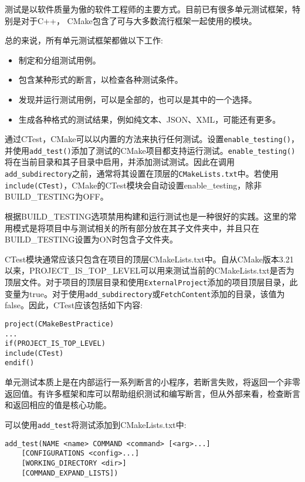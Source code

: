 测试是以软件质量为傲的软件工程师的主要方式。目前已有很多单元测试框架，特别是对于C++， CMake包含了可与大多数流行框架一起使用的模块。

总的来说，所有单元测试框架都做以下工作:

\begin{itemize}
\item 
制定和分组测试用例。

\item 
包含某种形式的断言，以检查各种测试条件。

\item 
发现并运行测试用例，可以是全部的，也可以是其中的一个选择。

\item 
生成各种格式的测试结果，例如纯文本、JSON、XML，可能还有更多。
\end{itemize}

通过CTest，CMake可以以内置的方法来执行任何测试。设置\texttt{enable\_testing()}，并使用\texttt{add\_test()}添加了测试的CMake项目都支持运行测试。\texttt{enable\_testing()}将在当前目录和其子目录中启用，并添加测试测试。因此在调用\texttt{add\_subdirectory}之前，通常将其设置在顶层的\texttt{CMakeLists.txt}中。若使用\texttt{include(CTest)}，CMake的CTest模块会自动设置enable\_testing，除非BUILD\_TESTING为OFF。

根据BUILD\_TESTING选项禁用构建和运行测试也是一种很好的实践。这里的常用模式是将项目中与测试相关的所有部分放在其子文件夹中，并且只在BUILD\_TESTING设置为ON时包含子文件夹。

CTest模块通常应该只包含在项目的顶层CMakeLists.txt中。自从CMake版本3.21以来，PROJECT\_IS\_TOP\_LEVEL可以用来测试当前的CMakeLists.txt是否为顶层文件。对于项目的顶层目录和使用\texttt{ExternalProject}添加的项目顶层目录，此变量为true。对于使用\texttt{add\_subdirectory}或\texttt{FetchContent}添加的目录，该值为false。因此，CTest应该包括如下内容:

\begin{lstlisting}[style=styleCMake]
project(CMakeBestPractice)
...
if(PROJECT_IS_TOP_LEVEL)
include(CTest)
endif()
\end{lstlisting}

单元测试本质上是在内部运行一系列断言的小程序，若断言失败，将返回一个非零返回值。有许多框架和库可以帮助组织测试和编写断言，但从外部来看，检查断言和返回相应的值是核心功能。

可以使用\texttt{add\_test}将测试添加到CMakeLists.txt中:

\begin{lstlisting}[style=styleCMake]
add_test(NAME <name> COMMAND <command> [<arg>...]
	[CONFIGURATIONS <config>...]
	[WORKING_DIRECTORY <dir>]
	[COMMAND_EXPAND_LISTS])
\end{lstlisting}

